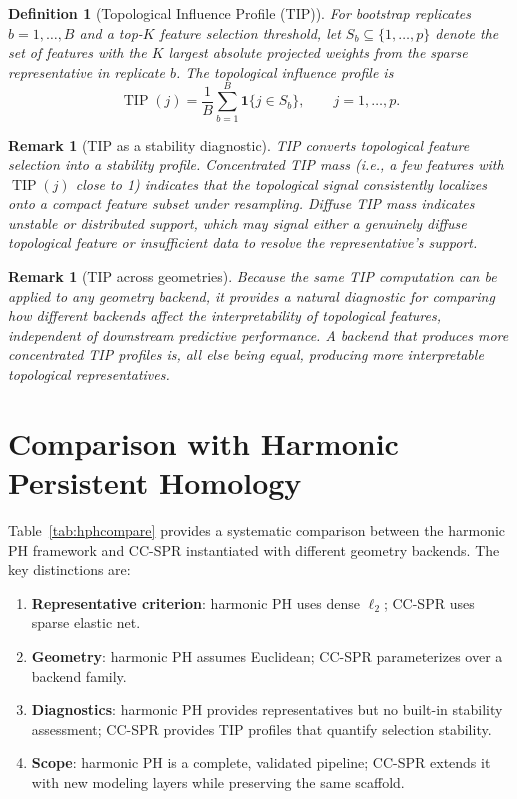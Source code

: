 \documentclass[11pt]{article}
\newtheorem{definition}[theorem]{Definition}
\newtheorem{remark}[theorem]{Remark}
\DeclareMathOperator{\TIP}{TIP}
\begin{document}
\begin{definition}[Topological Influence Profile (TIP)]
For bootstrap replicates $b = 1, \ldots, B$ and a top-$K$ feature selection threshold, let $S_b \subseteq \{1, \ldots, p\}$ denote the set of features with the $K$ largest absolute projected weights from the sparse representative in replicate $b$.
The \emph{topological influence profile} is
\[
\TIP(j) = \frac{1}{B} \sum_{b=1}^B \mathbf{1}\{j \in S_b\}, \qquad j = 1, \ldots, p.
\]
\end{definition}

\begin{remark}[TIP as a stability diagnostic]
TIP converts topological feature selection into a stability profile.
Concentrated TIP mass (i.e., a few features with $\TIP(j)$ close to 1) indicates that the topological signal consistently localizes onto a compact feature subset under resampling.
Diffuse TIP mass indicates unstable or distributed support, which may signal either a genuinely diffuse topological feature or insufficient data to resolve the representative's support.
\end{remark}

\begin{remark}[TIP across geometries]
Because the same TIP computation can be applied to any geometry backend, it provides a natural diagnostic for comparing how different backends affect the \emph{interpretability} of topological features, independent of downstream predictive performance.
A backend that produces more concentrated TIP profiles is, all else being equal, producing more interpretable topological representatives.
\end{remark}

\section{Comparison with Harmonic Persistent Homology}
\label{sec:comparison}

Table~\ref{tab:hphcompare} provides a systematic comparison between the harmonic PH framework and CC-SPR instantiated with different geometry backends.
The key distinctions are:
\begin{enumerate}[leftmargin=1.5em]
\item \textbf{Representative criterion}: harmonic PH uses dense $\ell_2$; CC-SPR uses sparse elastic net.
\item \textbf{Geometry}: harmonic PH assumes Euclidean; CC-SPR parameterizes over a backend family.
\item \textbf{Diagnostics}: harmonic PH provides representatives but no built-in stability assessment; CC-SPR provides TIP profiles that quantify selection stability.
\item \textbf{Scope}: harmonic PH is a complete, validated pipeline; CC-SPR extends it with new modeling layers while preserving the same scaffold.
\end{enumerate}
\end{document}
